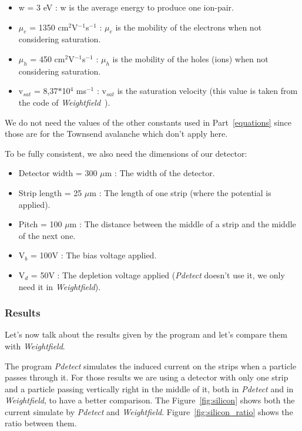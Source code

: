 \documentclass[11pt]{article}
\begin{document}
				\begin{itemize}

					\item w = 3 eV : w is the average energy to produce one ion-pair.
					\item $\mu_e$ = 1350 cm$^2$V$^{-1}$s$^{-1}$ : $\mu_e$ is the mobility of the electrons
						when not considering saturation.
					\item $\mu_h$ = 450 cm$^2$V$^{-1}$s$^{-1}$ : $\mu_h$ is the mobility of the holes (ions)
						when not considering saturation.
					\item v$_{sat}$ = 8,37$*$10$^{4}$ ms$^{-1}$ : v$_{sat}$ is the saturation velocity
							(this value is taken from the code of \textit{Weightfield}~\cite{Cenna2015}).

				\end{itemize}

				We do not need the values of the other constants used in Part~\ref{equations} since
				those are for the Townsend avalanche which don't apply here.

				To be fully consistent, we also need the dimensions of our detector:

				\begin{itemize}

					\item Detector width = 300 $\mu$m : The width of the detector.
					\item Strip length = 25 $\mu$m : The length of one strip (where the potential is
						applied).
					\item Pitch = 100 $\mu$m : The distance between the middle of a strip and the middle
						of the next one.
					\item V$_b$ = 100V : The bias voltage applied.
					\item V$_d$ = 50V : The depletion voltage applied (\textit{Pdetect} doesn't use it, we only
						need it in \textit{Weightfield}).

				\end{itemize}

			\subsubsection*{Results}

				Let's now talk about the results given by the program and let's compare them with \textit{Weightfield}.

				The program \textit{Pdetect} simulates the induced current on the strips when a particle passes through it.
				For those results we are using a detector with only one strip and a particle passing vertically right in
				the middle of it, both in \textit{Pdetect} and in \textit{Weightfield}, to have a better comparison. The
				Figure~\ref{fig:silicon} shows both the current simulate by \textit{Pdetect} and \textit{Weightfield}.
				Figure~\ref{fig:silicon_ratio} shows the ratio between them.
\end{document}
